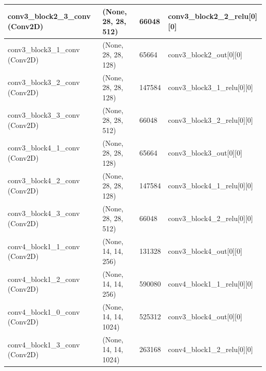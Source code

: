 \documentclass[12pt,oneside,geqno]{article}
\begin{document}
\begin{table}[]
{\begin{tabular}{llll}
				\multicolumn{1}{|l|}{conv3\_block2\_3\_conv (Conv2D)}  & \multicolumn{1}{l|}{(None, 28, 28, 512)}  & \multicolumn{1}{l|}{66048}   & \multicolumn{1}{l|}{conv3\_block2\_2\_relu{[}0{]}{[}0{]}} \\ \hline
				\multicolumn{1}{|l|}{conv3\_block3\_1\_conv (Conv2D)}  & \multicolumn{1}{l|}{(None, 28, 28, 128)}  & \multicolumn{1}{l|}{65664}   & \multicolumn{1}{l|}{conv3\_block2\_out{[}0{]}{[}0{]}}     \\ \hline
				\multicolumn{1}{|l|}{conv3\_block3\_2\_conv (Conv2D)}  & \multicolumn{1}{l|}{(None, 28, 28, 128)}  & \multicolumn{1}{l|}{147584}  & \multicolumn{1}{l|}{conv3\_block3\_1\_relu{[}0{]}{[}0{]}} \\ \hline
				\multicolumn{1}{|l|}{conv3\_block3\_3\_conv (Conv2D)}  & \multicolumn{1}{l|}{(None, 28, 28, 512)}  & \multicolumn{1}{l|}{66048}   & \multicolumn{1}{l|}{conv3\_block3\_2\_relu{[}0{]}{[}0{]}} \\ \hline
				\multicolumn{1}{|l|}{conv3\_block4\_1\_conv (Conv2D)}  & \multicolumn{1}{l|}{(None, 28, 28, 128)}  & \multicolumn{1}{l|}{65664}   & \multicolumn{1}{l|}{conv3\_block3\_out{[}0{]}{[}0{]}}     \\ \hline
				\multicolumn{1}{|l|}{conv3\_block4\_2\_conv (Conv2D)}  & \multicolumn{1}{l|}{(None, 28, 28, 128)}  & \multicolumn{1}{l|}{147584}  & \multicolumn{1}{l|}{conv3\_block4\_1\_relu{[}0{]}{[}0{]}} \\ \hline
				\multicolumn{1}{|l|}{conv3\_block4\_3\_conv (Conv2D)}  & \multicolumn{1}{l|}{(None, 28, 28, 512)}  & \multicolumn{1}{l|}{66048}   & \multicolumn{1}{l|}{conv3\_block4\_2\_relu{[}0{]}{[}0{]}} \\ \hline
				\multicolumn{1}{|l|}{conv4\_block1\_1\_conv (Conv2D)}  & \multicolumn{1}{l|}{(None, 14, 14, 256)}  & \multicolumn{1}{l|}{131328}  & \multicolumn{1}{l|}{conv3\_block4\_out{[}0{]}{[}0{]}}     \\ \hline
				\multicolumn{1}{|l|}{conv4\_block1\_2\_conv (Conv2D)}  & \multicolumn{1}{l|}{(None, 14, 14, 256)}  & \multicolumn{1}{l|}{590080}  & \multicolumn{1}{l|}{conv4\_block1\_1\_relu{[}0{]}{[}0{]}} \\ \hline
				\multicolumn{1}{|l|}{conv4\_block1\_0\_conv (Conv2D)}  & \multicolumn{1}{l|}{(None, 14, 14, 1024)} & \multicolumn{1}{l|}{525312}  & \multicolumn{1}{l|}{conv3\_block4\_out{[}0{]}{[}0{]}}     \\ \hline
				\multicolumn{1}{|l|}{conv4\_block1\_3\_conv (Conv2D)}  & \multicolumn{1}{l|}{(None, 14, 14, 1024)} & \multicolumn{1}{l|}{263168}  & \multicolumn{1}{l|}{conv4\_block1\_2\_relu{[}0{]}{[}0{]}} \\ \hline

\end{tabular}}
\end{table}
\end{document}
